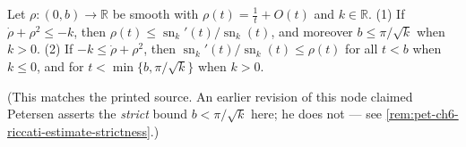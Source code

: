 \begin{corollary}
  \label{cor:pet-ch6-riccati-comparison-estimate}
  \leanok
  Let $\rho:(0,b)\to\mathbb{R}$ be smooth with $\rho(t)=\tfrac1t+O(t)$ and $k\in\mathbb{R}$.
  (1) If $\dot\rho+\rho^2\le-k$, then $\rho(t)\le\operatorname{sn}_k'(t)/\operatorname{sn}_k(t)$, and
  moreover $b\le\pi/\sqrt k$ when $k>0$. (2) If $-k\le\dot\rho+\rho^2$, then
  $\operatorname{sn}_k'(t)/\operatorname{sn}_k(t)\le\rho(t)$ for all $t<b$ when $k\le0$, and for
  $t<\min\{b,\pi/\sqrt k\}$ when $k>0$.

  (This matches the printed source. An earlier revision of this node claimed
  Petersen asserts the \emph{strict} bound $b<\pi/\sqrt k$ here; he does not —
  see \cref{rem:pet-ch6-riccati-estimate-strictness}.)
\end{corollary}

